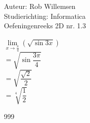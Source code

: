 \documentclass[a4paper]{article}
\begin{document}
\noindent \large Auteur: Rob Willemsen \\
\noindent \large Studierichting: Informatica\\
\noindent \large Oefeningenreeks 2D nr. 1.3\\

\medskip

\normalsize

$\lim\limits_{x \rightarrow \tfrac{\pi}{4}} (\sqrt{\sin 3x})$ \\ 

$= \sqrt{\sin \dfrac{3 \pi}{4}}$ \\

$= \sqrt{\dfrac{\sqrt{2}}{2}}$ \\

$= \sqrt[4]{\dfrac{1}{2}}$ \\

\begin{thebibliography}{999}
\end{thebibliography}
\end{document}
